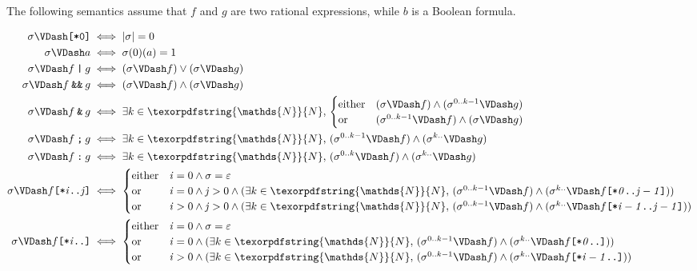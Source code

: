 \documentclass[a4paper,twoside,10pt,DIV=12,draft]{scrreprt}
\newcommand{\N}{\texorpdfstring{\ensuremath{\mathds{N}}}{N}}
\newcommand{\OR}{\mathbin{\texttt{|}}}
\newcommand{\AND}{\mathbin{\texttt{\&}}}
\newcommand{\ANDALT}{\mathbin{\texttt{\&\&}}}
\newcommand{\FUSION}{\mathbin{\texttt{:}}}
\newcommand{\CONCAT}{\mathbin{\texttt{;}}}
\newcommand{\0}{\texttt{0}}
\newcommand{\1}{\texttt{1}}
\newcommand{\STAR}[1]{\texttt{[*#1]}}
\newcommand{\eword}{\texttt{[*0]}}
\newcommand\mvar[1]{\ensuremath{\mathit{#1}}}
\begin{document}
The following semantics assume that $f$ and $g$ are two rational
expressions, while $b$ is a Boolean formula.

\begin{align*}
  \sigma\VDash \eword & \iff |\sigma| = 0 \\
  \sigma\VDash a      & \iff \sigma(0)(a) = 1 \\
  \sigma\VDash f\OR g &\iff (\sigma\VDash f) \lor (\sigma\VDash g) \\
  \sigma\VDash f\ANDALT g &\iff (\sigma \VDash f) \land (\sigma\VDash g) \\
  \sigma\VDash f\AND g &\iff \exists k\in\N,\,
  \begin{cases}
    \text{either} &(\sigma \VDash f) \land (\sigma^{0..k-1} \VDash g)\\
    \text{or} &(\sigma^{0..k-1} \VDash f) \land (\sigma \VDash g)
  \end{cases} \\
  \sigma\VDash f\CONCAT g&\iff \exists k\in\N,\,(\sigma^{0..k-1} \VDash f)\land(\sigma^{k..} \VDash g)\\
  \sigma\VDash f\FUSION g&\iff \exists k\in\N,\,(\sigma^{0..k} \VDash f)\land(\sigma^{k..} \VDash g)\\
  \sigma\VDash f\STAR{\mvar{i}..\mvar{j}}& \iff
  \begin{cases}
    \text{either} & \mvar{i}=0 \land \sigma=\varepsilon \\
    \text{or} & \mvar{i}=0 \land \mvar{j}>0 \land (\exists k\in\N,\,
      (\sigma^{0..k-1}\VDash f) \land (\sigma^{k..}
      \VDash f\STAR{\mvar{0}..\mvar{j-1}}))\\
    \text{or} & \mvar{i}>0 \land \mvar{j}>0 \land (\exists k\in\N,\,
      (\sigma^{0..k-1}\VDash f) \land (\sigma^{k..}
      \VDash f\STAR{\mvar{i-1}..\mvar{j-1}}))\\
  \end{cases}\\
  \sigma\VDash f\STAR{\mvar{i}..} & \iff
  \begin{cases}
    \text{either} & \mvar{i}=0 \land \sigma=\varepsilon \\
    \text{or} & \mvar{i}=0 \land (\exists k\in\N,\,
      (\sigma^{0..k-1}\VDash f) \land (\sigma^{k..}
      \VDash f\STAR{\mvar{0}..}))\\
    \text{or} & \mvar{i}>0 \land (\exists k\in\N,\,
      (\sigma^{0..k-1}\VDash f) \land (\sigma^{k..}
      \VDash f\STAR{\mvar{i-1}..}))\\
  \end{cases}\\

\end{align*}
\end{document}
